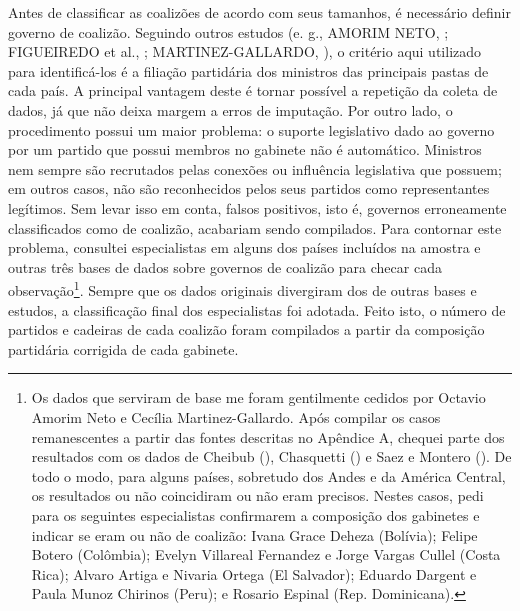 Antes de classificar as coalizões de acordo com seus tamanhos, é necessário definir governo de coalizão. Seguindo outros estudos (e. g., AMORIM NETO, \citeyear{neto2006}; FIGUEIREDO et al., \citeyear{figueiredo2012}; MARTINEZ-GALLARDO, \citeyear{martinez2012}), o critério aqui utilizado para identificá-los é a filiação partidária dos ministros das principais pastas de cada país. A principal vantagem deste é tornar possível a repetição da coleta de dados, já que não deixa margem a erros de imputação. Por outro lado, o procedimento possui um maior problema: o suporte legislativo dado ao governo por um partido que possui membros no gabinete não é automático. Ministros nem sempre são recrutados pelas conexões ou influência legislativa que possuem; em outros casos, não são reconhecidos pelos seus partidos como representantes legítimos. Sem levar isso em conta, falsos positivos, isto é, governos erroneamente classificados como de coalizão, acabariam sendo compilados. Para contornar este problema, consultei especialistas em alguns dos países incluídos na amostra e outras três bases de dados sobre governos de coalizão para checar cada observação\footnote{Os dados que serviram de base me foram gentilmente cedidos por Octavio Amorim Neto e Cecília Martinez-Gallardo. Após compilar os casos remanescentes a partir das fontes descritas no Apêndice A, chequei parte dos resultados com os dados de Cheibub (\citeyear{cheibub2007}), Chasquetti (\citeyear{chasquetti2001}) e Saez e Montero (\citeyear{alcantara2008}). De todo o modo, para alguns países, sobretudo dos Andes e da América Central, os resultados ou não coincidiram ou não eram precisos. Nestes casos, pedi para os seguintes especialistas confirmarem a composição dos gabinetes e indicar se eram ou não de coalizão: Ivana Grace Deheza (Bolívia); Felipe Botero (Colômbia); Evelyn Villareal Fernandez e Jorge Vargas Cullel (Costa Rica); Alvaro Artiga e Nivaria Ortega (El Salvador); Eduardo Dargent e Paula Munoz Chirinos (Peru); e Rosario Espinal (Rep. Dominicana).}. Sempre que os dados originais divergiram dos de outras bases e estudos, a classificação final dos especialistas foi adotada. Feito isto, o número de partidos e cadeiras de cada coalizão foram compilados a partir da composição partidária corrigida de cada gabinete.

